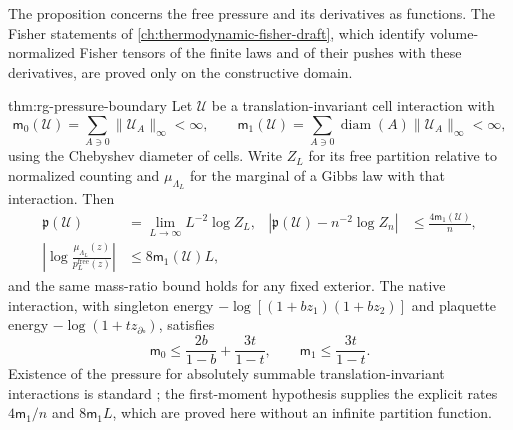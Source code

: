 The proposition concerns the free pressure and its derivatives as
functions. The Fisher statements of \cref{ch:thermodynamic-fisher-draft},
which identify volume-normalized Fisher tensors of the finite laws and of
their pushes with these derivatives, are proved only on the constructive
domain.

{thm:rg-pressure-boundary}
Let $\mathscr U$ be a translation-invariant cell interaction with
\begin{equation}
 \mathsf m_0(\mathscr U)=\sum_{A\ni0}\|\mathscr U_A\|_\infty<\infty,\qquad
 \mathsf m_1(\mathscr U)=\sum_{A\ni0}\operatorname{diam}(A)\|\mathscr U_A\|_\infty<\infty,
 \label{eq:rg-pressure-moments}
\end{equation}
using the Chebyshev diameter of cells. Write $Z_L$ for its free partition
relative to normalized counting and $\mu_{\Lambda_L}$ for the marginal of a
Gibbs law with that interaction. Then
\begin{align}
 \mathfrak p(\mathscr U)&=\lim_{L\to\infty}L^{-2}\log Z_L,
 &\left|\mathfrak p(\mathscr U)-n^{-2}\log Z_n\right|&\leq\frac{4\mathsf m_1(\mathscr U)}n,
 \label{eq:rg-pressure-limit}\\
 \left|\log\frac{\mu_{\Lambda_L}(z)}{p_L^{\mathrm{free}}(z)}\right|
 &\leq8\mathsf m_1(\mathscr U)L,
 \label{eq:rg-pressure-surface}
\end{align}
and the same mass-ratio bound holds for any fixed exterior. The native
interaction, with singleton energy $-\log[(1+bz_1)(1+bz_2)]$ and plaquette
energy $-\log(1+tz_{\partial\square})$, satisfies
\begin{equation}
 \mathsf m_0\leq\frac{2b}{1-b}+\frac{3t}{1-t},\qquad
 \mathsf m_1\leq\frac{3t}{1-t}.
 \label{eq:rg-pressure-native-moment}
\end{equation}
Existence of the pressure for absolutely summable translation-invariant
interactions is standard \citep[Chs.~15 and~16]{Georgii1988}; the
first-moment hypothesis supplies the explicit rates $4\mathsf m_1/n$ and
$8\mathsf m_1L$, which are proved here without an infinite partition
function. 

